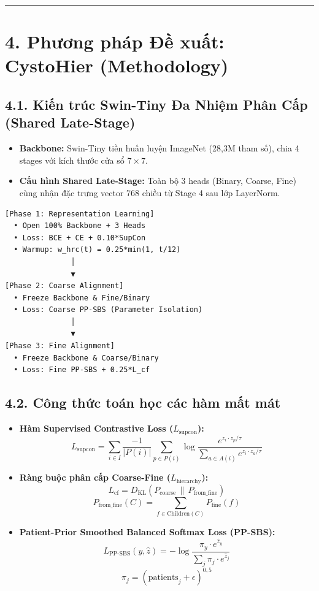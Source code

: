 \documentclass[
  10pt,
  a4paper,
  twocolumn]{article}
\providecommand{\tightlist}{%
  \setlength{\itemsep}{0pt}\setlength{\parskip}{0pt}}
\begin{document}
\begin{center}\rule{0.5\linewidth}{0.5pt}\end{center}

\section{4. Phương pháp Đề xuất: CystoHier
(Methodology)}\label{phux1b0ux1a1ng-phuxe1p-ux111ux1ec1-xuux1ea5t-cystohier-methodology}

\subsection{4.1. Kiến trúc Swin-Tiny Đa Nhiệm Phân Cấp (Shared
Late-Stage)}\label{kiux1ebfn-truxfac-swin-tiny-ux111a-nhiux1ec7m-phuxe2n-cux1ea5p-shared-late-stage}

\begin{itemize}
\tightlist
\item
  \textbf{Backbone:} Swin-Tiny tiền huấn luyện ImageNet (28,3M tham số),
  chia 4 stages với kích thước cửa sổ \(7 \times 7\).
\item
  \textbf{Cấu hình Shared Late-Stage:} Toàn bộ 3 heads (Binary, Coarse,
  Fine) cùng nhận đặc trưng vector 768 chiều từ Stage 4 sau lớp
  LayerNorm.
\end{itemize}

\begin{verbatim}
[Phase 1: Representation Learning]
  • Open 100% Backbone + 3 Heads
  • Loss: BCE + CE + 0.10*SupCon
  • Warmup: w_hrc(t) = 0.25*min(1, t/12)
               │
               ▼
[Phase 2: Coarse Alignment]
  • Freeze Backbone & Fine/Binary
  • Loss: Coarse PP-SBS (Parameter Isolation)
               │
               ▼
[Phase 3: Fine Alignment]
  • Freeze Backbone & Coarse/Binary
  • Loss: Fine PP-SBS + 0.25*L_cf
\end{verbatim}

\subsection{4.2. Công thức toán học các hàm mất
mát}\label{cuxf4ng-thux1ee9c-touxe1n-hux1ecdc-cuxe1c-huxe0m-mux1ea5t-muxe1t}

\begin{itemize}
\tightlist
\item
  \textbf{Hàm Supervised Contrastive Loss (\(L_{\text{supcon}}\)):}
  \[L_{\text{supcon}} = \sum_{i \in I} \frac{-1}{|P(i)|} \sum_{p \in P(i)} \log \frac{e^{z_i \cdot z_p / \tau}}{\sum_{a \in A(i)} e^{z_i \cdot z_a / \tau}}\]
\item
  \textbf{Ràng buộc phân cấp Coarse-Fine (\(L_{\text{hierarchy}}\)):}
  \[L_{\text{cf}} = D_{\text{KL}}\left(P_{\text{coarse}} \,\parallel\, P_{\text{from\_fine}}\right)\]
  \[P_{\text{from\_fine}}(C) = \sum_{f \in \text{Children}(C)} P_{\text{fine}}(f)\]
\item
  \textbf{Patient-Prior Smoothed Balanced Softmax Loss (PP-SBS):}
  \[L_{\text{PP-SBS}}(y, \hat{z}) = -\log \frac{\pi_y \cdot e^{\hat{z}_y}}{\sum_{j} \pi_j \cdot e^{\hat{z}_j}}\]
  \[\pi_j = (\text{patients}_j + \epsilon)^{0{,}5}\]
\end{itemize}
\end{document}
